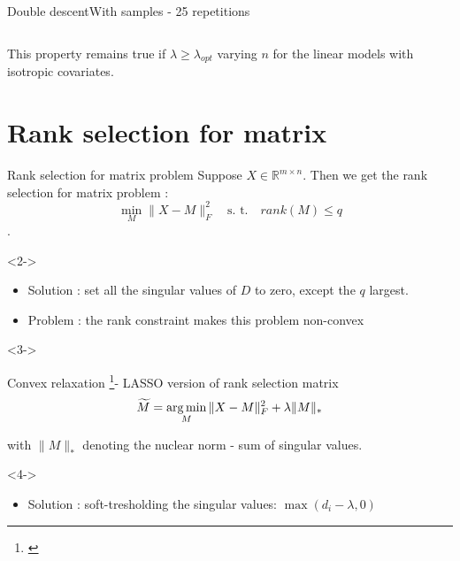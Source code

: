 \documentclass[10pt,aspectratio=43]{beamer}
\begin{document}
\begin{frame}{Double descent}{With samples \citep{nakkiran2020optimal} - 25 repetitions}
\begin{columns}
\begin{column}{0.7\textwidth}
\begin{center}
             \end{center}
        \end{column}
        \end{columns}
        \begin{block}{}
        This property remains true if $\lambda \geq \lambda_{opt}$ varying $n$ for the linear models with isotropic covariates.
        \end{block}
\end{frame}

\section{Rank selection for matrix}
\begin{frame}{Rank selection for matrix problem}{}
    Suppose $X \in \mathbb{R}^{m\times n }$. Then we get the rank selection for matrix problem :
    $$\min_{M} \|X-M\|_F^2 \quad \text{s. t.} \quad  rank(M) \leq q$$.
    \begin{onlyenv}<2->
    \begin{itemize}
        \item Solution : set all the singular values of $D$ to zero, except the $q$ largest.
        \item Problem : the rank constraint makes this problem non-convex
    \end{itemize}
    \end{onlyenv}
    \begin{onlyenv}<3->
        \begin{block}{Convex relaxation \footnote[frame]{\citet{Fazel02}}- LASSO version of rank selection matrix}
            $$\widetilde{M} = \mathop{\mathrm{arg\,min}}_{M} \|X-M\|_F^2 + \lambda \|M\|_*$$
            \begin{center}
                with $\|M\|_*$ denoting the nuclear norm - sum of singular values.
            \end{center}
        \end{block}
    \end{onlyenv}
    \begin{onlyenv}<4->
        \begin{itemize}
            \item Solution : soft-tresholding the singular values: $\max(d_i  -\lambda, 0)$
        \end{itemize}
        \end{onlyenv}
\end{frame}
\end{document}
